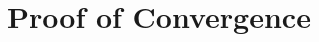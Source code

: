 \documentclass{jcmlatex}
\begin{document}
\section{Proof of Convergence}\label{appsect}%
\end{document}
